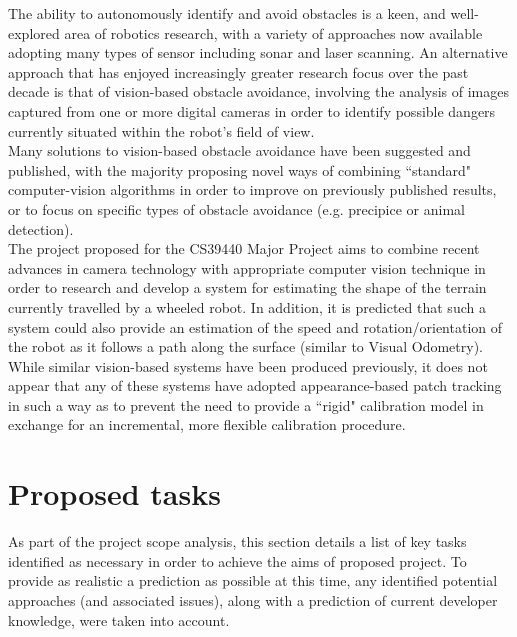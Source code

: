 \documentclass[10pt,fleqn,twoside]{article}
\begin{document}
The ability to autonomously identify and avoid obstacles is a keen, and well-explored area of robotics research, with a variety of approaches now available adopting many types of sensor including sonar and laser scanning. An alternative approach that has enjoyed increasingly greater research focus over the past decade is that of vision-based obstacle avoidance, involving the analysis of images captured from one or more digital cameras in order to identify possible dangers currently situated within the robot's field of view. \\ 

Many solutions to vision-based obstacle avoidance have been suggested and published, with the majority proposing novel ways of combining ``standard" computer-vision algorithms in order to improve on previously published results, or to focus on specific types of obstacle avoidance (e.g. precipice or animal detection). \\

The project proposed for the CS39440 Major Project aims to combine recent advances in camera technology with appropriate computer vision technique in order to research and develop a system for estimating the shape of the terrain currently travelled by a wheeled robot. In addition, it is predicted that such a system could also provide an estimation of the speed and rotation/orientation of the robot as it follows a path along the surface (similar to Visual Odometry). \\

While similar vision-based systems have been produced previously, it does not appear that any of these systems have adopted appearance-based patch tracking in such a way as to prevent the need to provide a ``rigid" calibration model in exchange for an incremental, more flexible calibration procedure. 


\section{Proposed tasks}

As part of the project scope analysis, this section details a list of key tasks identified as necessary in order to achieve the aims of proposed project. To provide as realistic a prediction as possible at this time, any identified potential approaches (and associated issues), along with a prediction of current developer knowledge, were taken into account.
\end{document}
